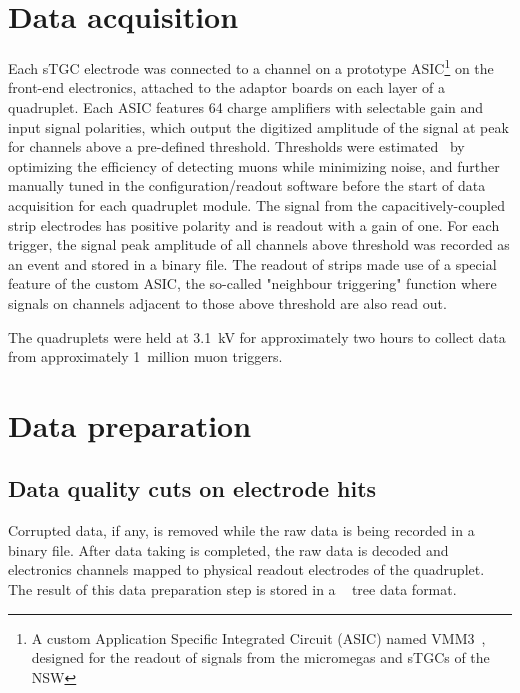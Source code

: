 \section{Data acquisition}
Each sTGC electrode was connected to a channel on a prototype ASIC\footnote{A custom Application Specific Integrated Circuit (ASIC) named VMM3~\cite{iakovidis_vmm3_2017}, designed for the readout of signals from the micromegas and sTGCs of the NSW} on the front-end electronics, attached to the adaptor boards on each layer of a quadruplet. Each ASIC features 64 charge amplifiers with selectable gain and input signal polarities, which output the digitized amplitude of the signal at peak for channels above a pre-defined threshold. Thresholds were estimated~\cite{chen_calibration_2019} by optimizing the efficiency of detecting muons while minimizing noise, and further manually tuned in the configuration/readout software before the start of data acquisition for each quadruplet module. The signal from the capacitively-coupled strip electrodes has positive polarity and is readout with a gain of one. For each trigger, the signal peak amplitude of all channels above threshold was recorded  as an event and stored in a binary file. The readout of strips made use of a special feature of the custom ASIC, the so-called "neighbour triggering" function where signals on channels adjacent to those above threshold are also read out.

The quadruplets were held at 3.1~kV for approximately two hours to collect data from approximately 1~million muon triggers.

\section{Data preparation}
\subsection{Data quality cuts on electrode hits}
\label{subsec:hit_cuts}
Corrupted data, if any, is removed while the raw data is being recorded in a binary file. After data taking is completed, the raw data is decoded and electronics channels mapped to physical readout electrodes of the quadruplet. The result of this data preparation step is stored in a ~\cite{ROOT_paper} tree data format. 


